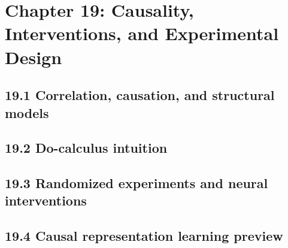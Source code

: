 \section{Chapter 19: Causality, Interventions, and Experimental Design}

\subsection{19.1 Correlation, causation, and structural models}

\subsection{19.2 Do-calculus intuition}

\subsection{19.3 Randomized experiments and neural interventions}

\subsection{19.4 Causal representation learning preview}

\clearpage
